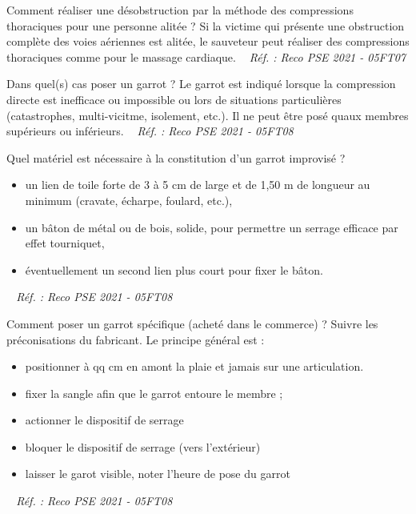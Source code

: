 \documentclass[grid,avery5371,landscape]{flashcards}
\makeatletter
\newcounter{nocarte}
\newcommand{\categ}[1]{%
  \def\@categ{#1}%
  \setcounter{nocarte}{0}%
}
\newcommand{\source}[1]{%
  \medskip
  \itshape%
   ~ \hfill Réf. : #1}
\makeatother
\begin{document}
\color[HTML]{003273}
\categ{PSE}
\begin{flashcard}[geste]{
 Comment réaliser une désobstruction par la méthode des compressions thoraciques pour une personne alitée ?   }
  Si la victime qui présente une obstruction complète des voies aériennes est alitée, le sauveteur peut réaliser des compressions thoraciques comme pour le massage cardiaque.
  \source{Reco PSE 2021 - 05FT07}
\end{flashcard}


\color[HTML]{003273}
\categ{PSE}
\begin{flashcard}[CAT]{
 Dans quel(s) cas poser un garrot ?   }
  Le garrot est indiqué lorsque la compression directe est inefficace ou impossible ou lors de situations particulières (catastrophes, multi-vicitme, isolement, etc.). Il ne peut être posé quaux membres supérieurs ou inférieurs.
  \source{Reco PSE 2021 - 05FT08}
\end{flashcard}


\color[HTML]{003273}
\categ{PSE}
\begin{flashcard}[matériel]{
 Quel matériel est nécessaire à la constitution d'un garrot improvisé ?   }
  \begin{itemize} 
\item un lien de toile forte de 3 à 5 cm de large et de 1,50 m de longueur au minimum (cravate, écharpe, foulard, etc.),
\item un bâton de métal ou de bois, solide, pour permettre un serrage efficace par effet tourniquet,
\item éventuellement un second lien plus court pour fixer le bâton.
\end{itemize}
  \source{Reco PSE 2021 - 05FT08}
\end{flashcard}


\color[HTML]{003273}
\categ{PSE}
\begin{flashcard}[geste]{
 Comment poser un garrot spécifique (acheté dans le commerce) ?   }
  Suivre les préconisations du fabricant. Le principe général est : \begin{itemize} 
\item positionner à qq cm en amont la plaie et jamais sur une articulation.
\item fixer la sangle afin que le garrot entoure le membre ;
\item actionner le dispositif de serrage 
\item bloquer le dispositif de serrage (vers l'extérieur)
\item laisser le garot visible, noter l'heure de pose du garrot  \end{itemize} 
  \source{Reco PSE 2021 - 05FT08}
\end{flashcard}
\end{document}
